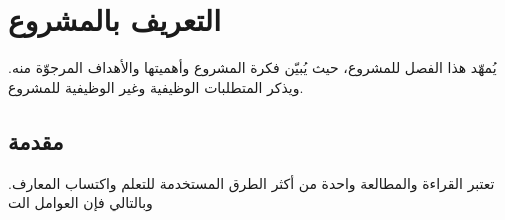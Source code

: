 

\chapter{التعريف بالمشروع}
يُمهّد هذا الفصل للمشروع، حيث يُبيّن فكرة المشروع وأهميتها والأهداف المرجوّة منه. ويذكر المتطلبات الوظيفية وغير الوظيفية للمشروع.

\section{مقدمة}
تعتبر القراءة والمطالعة واحدة من أكثر الطرق المستخدمة للتعلم واكتساب المعارف.
وبالتالي فإن العوامل الت

